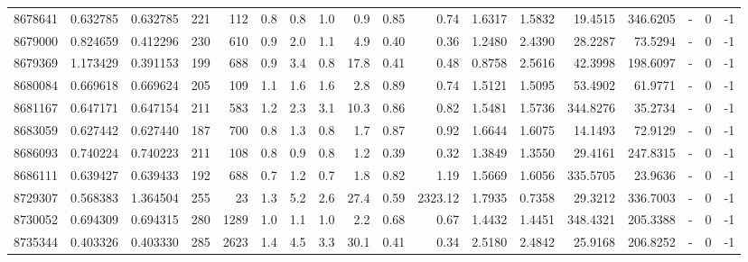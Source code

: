 \begin{tabular}{rrrrrrrrrrrrrrrlrr}
   8678641 & 0.632785 &   0.632785 &  221 &  112 &      0.8 &      0.8 &     1.0 &      0.9 &       0.85 &        0.74 &  1.6317 &  1.5832 &   19.4515 &  346.6205 &             - &        0 &         -1 \\
   8679000 & 0.824659 &   0.412296 &  230 &  610 &      0.9 &      2.0 &     1.1 &      4.9 &       0.40 &        0.36 &  1.2480 &  2.4390 &   28.2287 &   73.5294 &             - &        0 &         -1 \\
   8679369 & 1.173429 &   0.391153 &  199 &  688 &      0.9 &      3.4 &     0.8 &     17.8 &       0.41 &        0.48 &  0.8758 &  2.5616 &   42.3998 &  198.6097 &             - &        0 &         -1 \\
   8680084 & 0.669618 &   0.669624 &  205 &  109 &      1.1 &      1.6 &     1.6 &      2.8 &       0.89 &        0.74 &  1.5121 &  1.5095 &   53.4902 &   61.9771 &             - &        0 &         -1 \\
   8681167 & 0.647171 &   0.647154 &  211 &  583 &      1.2 &      2.3 &     3.1 &     10.3 &       0.86 &        0.82 &  1.5481 &  1.5736 &  344.8276 &   35.2734 &             - &        0 &         -1 \\
   8683059 & 0.627442 &   0.627440 &  187 &  700 &      0.8 &      1.3 &     0.8 &      1.7 &       0.87 &        0.92 &  1.6644 &  1.6075 &   14.1493 &   72.9129 &             - &        0 &         -1 \\
   8686093 & 0.740224 &   0.740223 &  211 &  108 &      0.8 &      0.9 &     0.8 &      1.2 &       0.39 &        0.32 &  1.3849 &  1.3550 &   29.4161 &  247.8315 &             - &        0 &         -1 \\
   8686111 & 0.639427 &   0.639433 &  192 &  688 &      0.7 &      1.2 &     0.7 &      1.8 &       0.82 &        1.19 &  1.5669 &  1.6056 &  335.5705 &   23.9636 &             - &        0 &         -1 \\
   8729307 & 0.568383 &   1.364504 &  255 &   23 &      1.3 &      5.2 &     2.6 &     27.4 &       0.59 &     2323.12 &  1.7935 &  0.7358 &   29.3212 &  336.7003 &             - &        0 &         -1 \\
   8730052 & 0.694309 &   0.694315 &  280 & 1289 &      1.0 &      1.1 &     1.0 &      2.2 &       0.68 &        0.67 &  1.4432 &  1.4451 &  348.4321 &  205.3388 &             - &        0 &         -1 \\
   8735344 & 0.403326 &   0.403330 &  285 & 2623 &      1.4 &      4.5 &     3.3 &     30.1 &       0.41 &        0.34 &  2.5180 &  2.4842 &   25.9168 &  206.8252 &             - &        0 &         -1 \\

\end{tabular}
